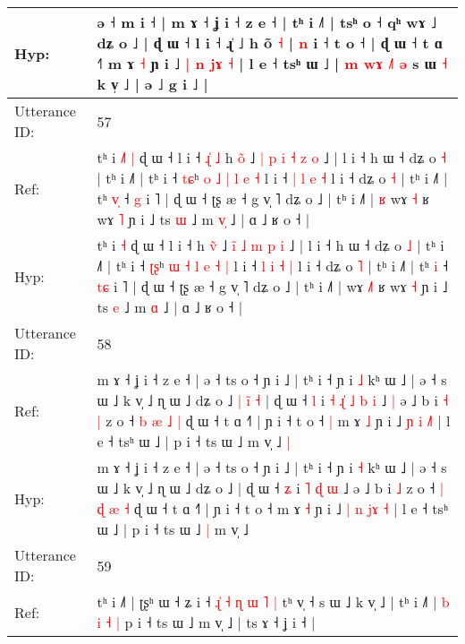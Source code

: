 \documentclass[10pt]{article}
\DeclareRobustCommand{\hl}[1]{{\textcolor{red}{#1}}}
\begin{document}
\begin{longtable}{ll}
 \\
Hyp: & ə ˧ m i ˧ | m ɤ ˧ ʝ i ˧ z e ˧ | tʰ i ˩˥ | tsʰ o ˧ qʰ wɤ ˩ dʑ o ˩ | ɖ ɯ ˧ l i ˧ ɻ̍ ˩ h õ \hl{˧} | \hl{n} i ˧ t o ˧ | ɖ ɯ ˧ t ɑ ˧˥\hl{}\hl{} m ɤ \hl{˧} ɲ i ˩ \hl{|} \hl{n} \hl{j}\hl{ɤ}\hl{ }\hl{˧} | l e ˧ tsʰ ɯ ˩ |\hl{ }\hl{m}\hl{ }\hl{w}\hl{ɤ} \hl{˩}\hl{˥} \hl{ə} s ɯ \hl{˧} k v̩ ˩ | ə ˩ g i ˩ |
 \\
\midrule
Utterance ID: & 57 \\
Ref: & tʰ i\hl{ }\hl{˩}\hl{˥} \hl{|} ɖ ɯ ˧ l i ˧\hl{ }\hl{ɻ}\hl{̍}\hl{ }\hl{˩} h \hl{o}̃ ˩ \hl{|}\hl{ }\hl{p} \hl{i} \hl{˧} \hl{z} \hl{o} ˩ | l i ˧ h ɯ ˧ dʑ o \hl{˧} | tʰ i ˩˥ | tʰ i ˧ \hl{t}\hl{ɕ}ʰ \hl{o} \hl{˩} \hl{|} \hl{l} \hl{e} \hl{˧} l i ˧ \hl{|} \hl{l} \hl{e} \hl{˧} l i ˧ dʑ o \hl{˧} | tʰ i ˩˥ | tʰ \hl{v}\hl{̩} ˧ \hl{}\hl{g} i ˥ | ɖ ɯ ˧ ʈʂ æ ˧ g v̩ ˥ dʑ o ˩ | tʰ i ˩˥ |\hl{ }\hl{ʁ} wɤ \hl{}\hl{˧} ʁ wɤ \hl{˥} ɲ i ˩ ts \hl{ɯ} ˩ m \hl{v}\hl{̩} ˩ | ɑ ˩ ʁ o ˧ |
 \\
Hyp: & tʰ i\hl{}\hl{}\hl{} \hl{˧} ɖ ɯ ˧ l i ˧\hl{}\hl{}\hl{}\hl{}\hl{} h \hl{v}̃ ˩ \hl{}\hl{i}\hl{̃} \hl{˩} \hl{m} \hl{p} \hl{i} ˩ | l i ˧ h ɯ ˧ dʑ o \hl{˩} | tʰ i ˩˥ | tʰ i ˧ \hl{ʈ}\hl{ʂ}ʰ \hl{ɯ} \hl{˧} \hl{l} \hl{e} \hl{˧} \hl{|} l i ˧ \hl{l} \hl{i} \hl{˧} \hl{|} l i ˧ dʑ o \hl{˥} | tʰ i ˩˥ | tʰ \hl{}\hl{i} ˧ \hl{t}\hl{ɕ} i ˥ | ɖ ɯ ˧ ʈʂ æ ˧ g v̩ ˥ dʑ o ˩ | tʰ i ˩˥ |\hl{}\hl{} wɤ \hl{˩}\hl{˥} ʁ wɤ \hl{˧} ɲ i ˩ ts \hl{e} ˩ m \hl{}\hl{ɑ} ˩ | ɑ ˩ ʁ o ˧ |
 \\
\midrule
Utterance ID: & 58 \\
Ref: & m ɤ ˧ ʝ i ˧ z e ˧ | ə ˧ ts o ˧ ɲ i ˩ | tʰ i ˧ ɲ i \hl{˩} kʰ ɯ ˩ | ə ˧ s ɯ ˩ k v̩ ˩ ɳ ɯ ˩ dʑ o ˩\hl{ }\hl{|}\hl{ }\hl{i}\hl{̃}\hl{ }\hl{˧} | ɖ ɯ ˧ \hl{l} i\hl{ }\hl{˧}\hl{ }\hl{ɻ}\hl{̍} \hl{˩} \hl{b} \hl{i} ˩\hl{ }\hl{|} ə ˩ b i\hl{ }\hl{˧} \hl{|} z o ˧ \hl{b} \hl{æ} \hl{˩} \hl{|} ɖ ɯ ˧ t ɑ ˧˥ | ɲ i ˧ t o ˧\hl{ }\hl{|} m ɤ \hl{˩} ɲ i ˩ \hl{ɲ} \hl{i} \hl{}\hl{}\hl{˩}\hl{˥} | l e ˧ tsʰ ɯ ˩ | p i ˧ ts ɯ ˩\hl{}\hl{} m v̩ ˩\hl{ }\hl{|}
 \\
Hyp: & m ɤ ˧ ʝ i ˧ z e ˧ | ə ˧ ts o ˧ ɲ i ˩ | tʰ i ˧ ɲ i \hl{˧} kʰ ɯ ˩ | ə ˧ s ɯ ˩ k v̩ ˩ ɳ ɯ ˩ dʑ o ˩\hl{}\hl{}\hl{}\hl{}\hl{}\hl{}\hl{} | ɖ ɯ ˧ \hl{ʑ} i\hl{}\hl{}\hl{}\hl{}\hl{} \hl{˥} \hl{ɖ} \hl{ɯ} ˩\hl{}\hl{} ə ˩ b i\hl{}\hl{} \hl{˩} z o ˧ \hl{|} \hl{ɖ} \hl{æ} \hl{˧} ɖ ɯ ˧ t ɑ ˧˥ | ɲ i ˧ t o ˧\hl{}\hl{} m ɤ \hl{˧} ɲ i ˩ \hl{|} \hl{n} \hl{j}\hl{ɤ}\hl{ }\hl{˧} | l e ˧ tsʰ ɯ ˩ | p i ˧ ts ɯ ˩\hl{ }\hl{|} m v̩ ˩\hl{}\hl{}
 \\
\midrule
Utterance ID: & 59 \\
Ref: & tʰ i ˩˥ | ʈʂʰ ɯ ˧ ʑ i ˧\hl{ }\hl{ɻ}\hl{̍} \hl{˧} \hl{ɳ} \hl{ɯ} \hl{˥} \hl{|} tʰ v̩ ˧ s ɯ ˩ k v̩ ˩ | tʰ i ˩˥ |\hl{}\hl{}\hl{}\hl{}\hl{} \hl{b} \hl{i} \hl{˧} \hl{|} p i ˧ ts ɯ ˩\hl{}\hl{} m v̩ ˩ | ts ɤ ˧ ʝ i ˧ |

\end{longtable}
\end{document}

